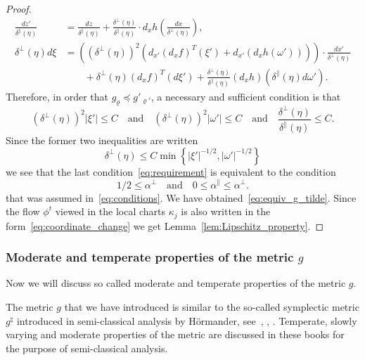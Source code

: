 \documentclass[AHL,Unicode,longabstracts,published]{cedram}
\begin{document}
\begin{proof}
\begin{align*}
\frac{dz'}{\delta^{\parallel}\left(\eta\right)} & =\frac{dz}{\delta^{\parallel}\left(\eta\right)}+\frac{\delta^{\perp}\left(\eta\right)}{\delta^{\parallel}\left(\eta\right)}\cdot d_{x}h\left(\frac{dx}{\delta^{\perp}\left(\eta\right)}\right),\\
\delta^{\perp}\left(\eta\right)d\xi & =\left((\delta^{\perp}\left(\eta\right))^{2}\left(d_{x'}\left(d_{x}f\right)^{T}(\xi')+d_{x'}\left(d_{x}h(\omega')\right)\right)\right)\cdot\frac{dx'}{\delta^{\perp}\left(\eta\right)}\\
& \qquad+\delta^{\perp}\left(\eta\right)\left(d_{x}f\right)^{T}\left(d\xi'\right)+\frac{\delta^{\perp}\left(\eta\right)}{\delta^{\parallel}\left(\eta\right)}\left(d_{x}h\right)\left(\delta^{\parallel}\left(\eta\right)d\omega'\right).
\end{align*}
Therefore, in order that $g_{\varrho}\preceq g'_{\varrho'}$, a necessary and sufficient condition is that
\begin{equation}\label{eq:requirement}
(\delta^{\perp}\left(\eta\right))^{2}\left|\xi'\right|\leq C\quad\text{and}\quad(\delta^{\perp}\left(\eta\right))^{2}\left|\omega'\right|\leq C\quad\text{and}\quad\frac{\delta^{\perp}\left(\eta\right)}{\delta^{\parallel}\left(\eta\right)}\leq C.
\end{equation}
Since the former two inequalities are written
\[
\delta^{\perp}\left(\eta\right)\leq C\min\left\{ \left|\xi'\right|^{-1/2},\left|\omega'\right|^{-1/2}\right\}
\]
we see that the last condition~\eqref{eq:requirement} is equivalent to the condition
\[
1/2\leq\alpha^{\perp}\quad\text{and}\quad0\leq\alpha^{\parallel}\leq\alpha^{\perp}.
\]
that was assumed in~\eqref{eq:conditions}. We have obtained~\eqref{eq:equiv_g_tilde}. Since the flow $\phi^{t}$ viewed in the local charts $\kappa_{j}$ is also written in the form~\eqref{eq:coordinate_change} we get Lemma~\ref{lem:Lipschitz_property}.
\end{proof}

\subsubsection{Moderate and temperate properties of the metric \texorpdfstring{$g$}{g}}

Now we will discuss so called moderate and temperate properties of the metric $g$.

\begin{rema}
The metric $g$ that we have introduced is similar to the so-called symplectic metric $g^{\natural}$ introduced in semi-classical analysis by H\"ormander, see~\cite[Defi.~2.2.19, p.~78]{lerner2011metrics}, \cite[Chap.~XVIII]{hormander_3}, \cite{nicola_rodino_livre_11}. Temperate, slowly varying and moderate properties of the metric are discussed in these books for the purpose of semi-classical analysis.
\end{rema}
\end{document}
